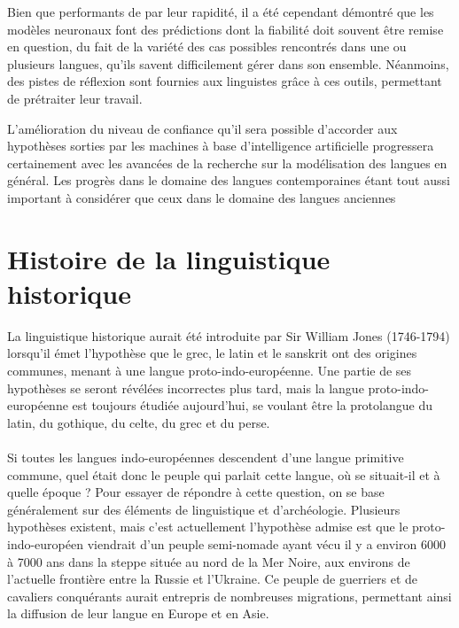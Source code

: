 \documentclass[12pt, twoside]{report}
\begin{document}
Bien que performants de par leur rapidité, il a été cependant démontré que les modèles neuronaux font des prédictions dont la fiabilité doit souvent être remise en question, du fait de la variété des cas possibles rencontrés dans une ou plusieurs langues, qu'ils savent difficilement gérer dans son ensemble. Néanmoins, des pistes de réflexion sont fournies aux linguistes grâce à ces outils, permettant de prétraiter leur travail.

L'amélioration du niveau de confiance qu'il sera possible d'accorder aux hypothèses sorties par les machines à base d'intelligence artificielle progressera certainement avec les avancées de la recherche sur la modélisation des langues en général. Les progrès dans le domaine des langues contemporaines étant tout aussi important à considérer que ceux dans le domaine des langues anciennes

\printbibliography[heading=bibintoc]

\appendix

\chapter{Histoire de la linguistique historique} \label{histoire_LH}

\indent La linguistique historique aurait été introduite par Sir William Jones (1746-1794) lorsqu'il émet l'hypothèse que le grec, le latin et le sanskrit ont des origines communes, menant à une langue proto-indo-européenne. Une partie de ses hypothèses se seront révélées incorrectes plus tard, mais la langue proto-indo-européenne est toujours étudiée aujourd'hui, se voulant être la protolangue du latin, du gothique, du celte, du grec et du perse.  \\ \\ 
\indent Si toutes les langues indo-européennes descendent d'une langue primitive commune, quel était donc le peuple qui parlait cette langue, où se situait-il et à quelle époque ? Pour  essayer de répondre à cette question, on se base généralement sur des éléments de linguistique et d'archéologie. Plusieurs hypothèses existent, mais c'est actuellement l'hypothèse admise est que le proto-indo-européen viendrait d'un peuple semi-nomade ayant vécu il y a environ 6000 à 7000 ans dans la steppe située au nord de la Mer Noire, aux environs de  l'actuelle frontière entre la Russie et l'Ukraine. Ce peuple de guerriers et de cavaliers conquérants aurait entrepris de nombreuses migrations, permettant ainsi la diffusion de leur langue en Europe et en Asie.
\end{document}
